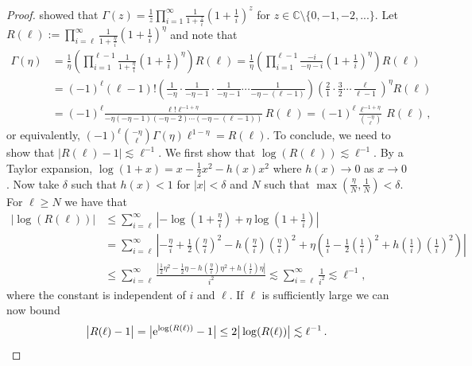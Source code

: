 \documentclass[12pt]{article} %
\newcommand{\abs}[1]{\left| #1 \right|}
\begin{document}
\begin{proof}
 \cite{Euler1738} showed that
%
$\Gamma(z) = \frac{1}{z} \prod_{i = 1}^{\infty} \frac{1}{1 + \frac{z}{i}} \left( 1 + \frac{1}{i} \right)^{z}$ for $ z\in \mathbb C \setminus \{0,-1,-2,...\}  .$
Let $R(\ell) := \prod_{i = \ell}^{\infty} \frac{1}{1 + \frac{\eta}{i}} \left( 1 + \frac{1}{i} \right)^{\eta}$ and note that
\begin{align*}
    \Gamma(\eta) & = \frac{1}{\eta} \left( \prod_{i = 1}^{\ell - 1} \frac{1}{1 + \frac{\eta}{i}} \left( 1 + \frac{1}{i} \right)^{\eta} \right) R(\ell) 
    = \frac{1}{\eta} \left( \prod_{i = 1}^{\ell - 1} \frac{-i}{-\eta - i} \left( 1 + \frac{1}{i} \right)^{\eta} \right) R(\ell) \, \\
    & = (-1)^{\ell} (\ell - 1)! \left(\frac{1}{-\eta} \cdot \frac{1}{-\eta - 1} \cdot \frac{1}{-\eta - 1} \cdots \frac{1}{-\eta - (\ell - 1)} \right) \left( \frac{2}{1} \cdot \frac{3}{2} \cdots \frac{\ell}{\ell - 1} \right)^{\eta} R(\ell) \, \\[0.2cm]
    & = (-1)^{\ell} \frac{\ell! \ell^{-1+\eta} }{-\eta(-\eta - 1)(-\eta - 2) \cdots (-\eta - (\ell - 1))}\, R(\ell)= (-1)^{\ell}\frac{ \ell^{-1+\eta}}{\binom{-\eta}{\ell}}\, R(\ell)  \, ,
\end{align*}
or equivalently,
$(-1)^\ell \binom{-\eta}{\ell} \Gamma(\eta) \ell^{1 - \eta} = R(\ell)$.  To conclude, we need to show that $|R(\ell) - 1| \lesssim \ell^{-1}$. 
We first show that $\log(R(\ell)) \lesssim \ell^{-1}$. 
By a Taylor expansion, $\log(1 + x) = x - \frac{1}{2} x^2 - h(x) x^2$  where 
$h(x) \rightarrow 0$ as $x \rightarrow 0$. Now take $\delta$ such that $h(x) < 1$ for $|x| < \delta$ and $N$ such that $\max\left(\frac{\eta}{N}, \frac{1}{N} \right) < \delta$. For $\ell \geq N$ we have that
\begin{align*}
\abs{\log(R(\ell))} &\leq \sum_{i = \ell}^{\infty} \abs{-\log \left(1 + \frac{\eta}{i} \right) + \eta \log \left(1 + \frac{1}{i} \right) } \\
& = \sum_{i = \ell}^{\infty} \abs{-\frac{\eta}{i} + \frac{1}{2} \left(\frac{\eta}{i}\right)^2 - h \left(\frac{\eta}{i} \right) \left(\frac{\eta}{i}\right)^2 + \eta \left( \frac{1}{i} - \frac{1}{2} \left( \frac{1}{i} \right)^2 + h \left(\frac{1}{i} \right) \left(\frac{1}{i}\right)^2 \right) } \\
& \leq \sum_{i = \ell}^{\infty}  \frac{\abs{\frac{1}{2} \eta^2 -  \frac{1}{2} \eta - h \left(\frac{\eta}{i} \right) \eta^2 + h \left(\frac{1}{i} \right)\eta}}{i^2} \lesssim \sum_{i = \ell}^\infty \frac{1}{i^2} \lesssim \ell^{-1} ,
\end{align*}
where the constant is independent of $i$ and $\ell$. If $\ell$ is sufficiently large we can now bound
\begin{equation*}
 \big|R(\ell) - 1 \big| = \big|\mathrm{e}^{\log(R(\ell))} - 1\big| \leq 2 \big| \log(R(\ell)) \big| \lesssim \ell^{-1} \,. \qedhere
\end{equation*}
\end{proof}
\end{document}
